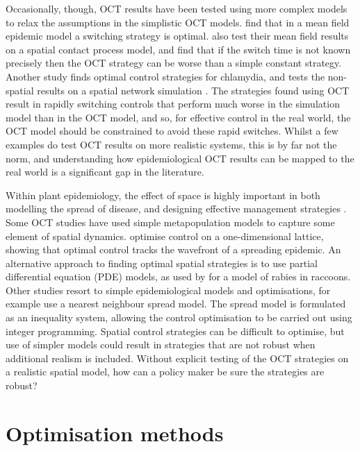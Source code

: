 Occasionally, though, OCT results have been tested using more complex models to relax the assumptions in the simplistic OCT models. \citet{forster_optimizing_2007} find that in a mean field epidemic model a switching strategy is optimal. \citeauthor{forster_optimizing_2007} also test their mean field results on a spatial contact process model, and find that if the switch time is not known precisely then the OCT strategy can be worse than a simple constant strategy. Another study finds optimal control strategies for chlamydia, and tests the non-spatial results on a spatial network simulation \citep{clarke_approximating_2013}. The strategies found using OCT result in rapidly switching controls that perform much worse in the simulation model than in the OCT model, and so, for effective control in the real world, the OCT model should be constrained to avoid these rapid switches. Whilst a few examples do test OCT results on more realistic systems, this is by far not the norm, and understanding how epidemiological OCT results can be mapped to the real world is a significant gap in the literature.

Within plant epidemiology, the effect of space is highly important in both modelling the spread of disease, and designing effective management strategies \citep{ostfeld_spatial_2005, plantegenest_landscape_2007}. Some OCT studies have used simple metapopulation models to capture some element of spatial dynamics. \citet{ndeffo_mbah_optimal_2014} optimise control on a one-dimensional lattice, showing that optimal control tracks the wavefront of a spreading epidemic. An alternative approach to finding optimal spatial strategies is to use partial differential equation (PDE) models, as used by \citet{neilan_optimal_2011} for a model of rabies in raccoons. Other studies resort to simple epidemiological models and optimisations, for example \citet{epanchin_optimal_2012} use a nearest neighbour spread model. The spread model is formulated as an inequality system, allowing the control optimisation to be carried out using integer programming. Spatial control strategies can be difficult to optimise, but use of simpler models could result in strategies that are not robust when additional realism is included. Without explicit testing of the OCT strategies on a realistic spatial model, how can a policy maker be sure the strategies are robust?

\section{Optimisation methods}\label{sec:ch2:optim_methods}

